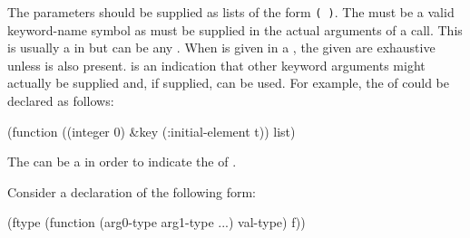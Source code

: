 The  parameters 
should be supplied as lists of the form {\tt ( )}.  
The  must be a valid keyword-name symbol
as must be supplied in the actual arguments of a
call.
This is usually a  in  but can be any .
When  is given in a
  ,
the  given
are exhaustive unless  is also present. 
 is an indication 
that other keyword arguments might actually be
supplied and, if supplied, can be used. 
For example,
the  of  could be declared as follows:

\code
 (function ((integer 0) &key (:initial-element t)) list)
\endcode
{}

The  can be a  
 in order to indicate the
 of .


%
%
%

Consider a declaration of the following form:
                                   
\code
 (ftype (function (arg0-type arg1-type ...) val-type) f))
\endcode
 

